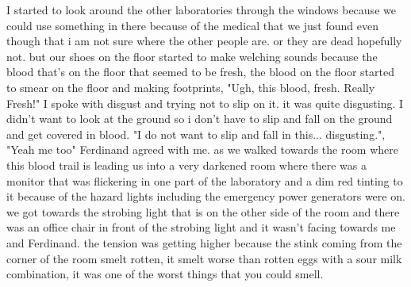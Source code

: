 \documentclass[14pt,letterpaper]{book}
\begin{document}
I started to look around the other laboratories through the windows because we could use something in there because of the medical that we just found even though that i am not sure where the other people are. or they are dead hopefully not. but our shoes on the floor started to make welching sounds because the blood that's on the floor that seemed to be fresh, the blood on the floor started to smear  on the floor and making footprints, "Ugh, this blood, fresh. Really Fresh!" I spoke with disgust and trying not to slip on it. it was quite disgusting. I didn't want to look at the ground so i don't have to slip and fall on the ground and get covered in blood. "I do not want to slip and fall in this... disgusting.", "Yeah me too" Ferdinand agreed with me. as we walked towards the room where this blood trail is leading us into a very darkened room where there was a monitor that was flickering in one part of the laboratory and a dim red tinting to it because of the hazard lights including the emergency power generators were on. we got towards the strobing light that is on the other side of the room and there was an office chair in front of the strobing light and it wasn't facing towards me and Ferdinand. the tension was getting higher because the stink coming from the corner of the room smelt rotten, it smelt worse than rotten eggs with a sour milk combination, it was one of the worst things that you could smell.
\end{document}
